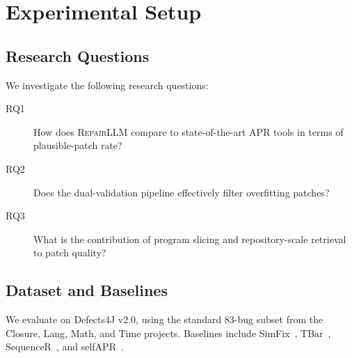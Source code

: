 \section{Experimental Setup}

\subsection{Research Questions}

We investigate the following research questions:

\begin{description}
  \item[RQ1] How does \textsc{RepairLLM} compare to state-of-the-art APR
        tools in terms of plausible-patch rate?
  \item[RQ2] Does the dual-validation pipeline effectively filter
        overfitting patches?
  \item[RQ3] What is the contribution of program slicing and repository-scale
        retrieval to patch quality?
\end{description}

\subsection{Dataset and Baselines}

We evaluate on Defects4J v2.0, using the standard 83-bug subset from the
Closure, Lang, Math, and Time projects. Baselines include
SimFix~\cite{jiang2018simfix}, TBar~\cite{liu2019tbar},
SequenceR~\cite{chen2019sequence}, and selfAPR~\cite{ye2021selfapr}.


